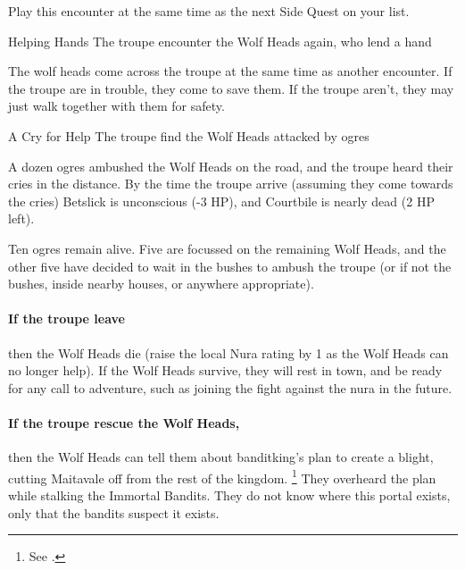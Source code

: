 Play this encounter at the same time as the next Side Quest on your list.

{\squash Helping Hands}%
{The troupe encounter the Wolf Heads again, who lend a hand}%

The wolf heads come across the troupe at the same time as another encounter.
If the troupe are in trouble, they come to save them.
If the troupe aren't, they may just walk together with them for safety.

{A Cry for Help}%
{The troupe find the Wolf Heads attacked by ogres}%

A dozen ogres ambushed the Wolf Heads on the road, and the troupe heard their cries in the distance.
By the time the troupe arrive (assuming they come towards the cries) Betslick is unconscious (-3 HP), and Courtbile is nearly dead (2 HP left).

Ten ogres remain alive.
Five are focussed on the remaining Wolf Heads, and the other five have decided to wait in the bushes to ambush the troupe (or if not the bushes, inside nearby houses, or anywhere appropriate).

\paragraph{\N If the troupe leave}
then the Wolf Heads die (raise the local Nura rating by 1 as the Wolf Heads can no longer help).
If the Wolf Heads survive, they will rest in \gls{town}, and be ready for any call to adventure, such as joining the fight against the nura in the future.

\paragraph{If the troupe rescue the Wolf Heads,}
then the Wolf Heads can tell them about \gls{banditking}'s plan to create a blight, cutting Maitavale off from the rest of the kingdom.%
\footnote{See .}
They overheard the plan while stalking the Immortal Bandits.
They do not know where this portal exists, only that the bandits suspect it exists.



\stopcontents[sq]


